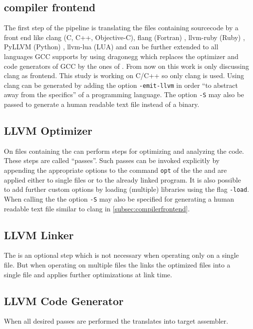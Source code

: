 \subsection{compiler frontend}\label{subsec:compilerfrontend}
The first step of the pipeline is translating the files containing sourcecode by a front end like clang (C, C++, Objective-C), flang (Fortran) \cite{fortranllvm}, llvm-ruby (Ruby) \cite{rubyllvm}, PyLLVM (Python) \cite{pyllvm}, llvm-lua (LUA) \cite{luallvm} and can be further extended to all languages GCC supports by using dragonegg \cite{dragonegg} which replaces the optimizer and code generators of GCC by the ones of \llvm.
From now on this work is only discussing clang as frontend.
This study is working on C/C++ so only clang is used.
Using clang \llvmir can be generated by adding the option \texttt{-emit-llvm} in order \enquote{to abstract away from the specifics} \cite{FastScopDetection} of a programming language.
The option \texttt{-S} may also be passed to generate a human readable text file instead of a \llvmir binary.
\subsection{LLVM Optimizer}\label{subsec:optimizer}
On files containing \llvmir the \opt can perform steps for optimizing and analyzing the code.
These steps are called \enquote{passes}.
Such passes can be invoked explicitly by appending the appropriate options to the command \texttt{opt} of the the \opt and are applied either to single files or to the already linked program.
It is also possible to add further custom options by loading (multiple) libraries using the flag \texttt{-load}.
When calling the \opt the option \texttt{-S} may also be specified for generating a human readable text file similar to clang in \autoref{subsec:compilerfrontend}.
\subsection{LLVM Linker}
The \linker is an optional step which is not necessary when operating only on a single \llvmir file.
But when operating on multiple files the \linker links the optimized \llvmir files into a single \llvmir file and applies further optimizations at link time.
\subsection{LLVM Code Generator}
When all desired passes are performed the \generator translates \llvmir into target assembler.
